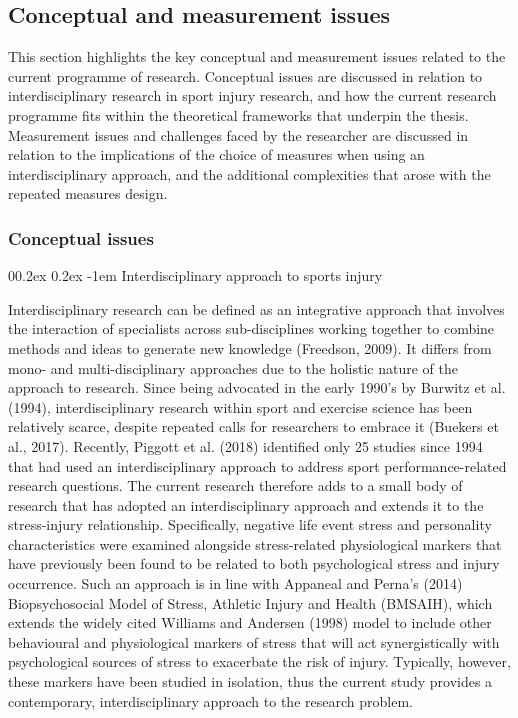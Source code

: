 \documentclass[
  english,
  man,floatsintext]{apa6}
\makeatletter
\renewcommand{\paragraph}{\@startsection{paragraph}{4}{\parindent}%
  {0\baselineskip \@plus 0.2ex \@minus 0.2ex}%
  {-1em}%
  {\normalfont\normalsize\bfseries\itshape\typesectitle}}
\makeatother
\begin{document}
\hypertarget{conceptual-and-measurement-issues}{%
\subsection{Conceptual and measurement issues}\label{conceptual-and-measurement-issues}}

This section highlights the key conceptual and measurement issues related to the current programme of research.
Conceptual issues are discussed in relation to interdisciplinary research in sport injury research, and how the current research programme fits within the theoretical frameworks that underpin the thesis.
Measurement issues and challenges faced by the researcher are discussed in relation to the implications of the choice of measures when using an interdisciplinary approach, and the additional complexities that arose with the repeated measures design.

\hypertarget{conceptual-issues}{%
\subsubsection{Conceptual issues}\label{conceptual-issues}}

\hypertarget{interdisciplinary-approach-to-sports-injury}{%
\paragraph{Interdisciplinary approach to sports injury}\label{interdisciplinary-approach-to-sports-injury}}

Interdisciplinary research can be defined as an integrative approach that involves the interaction of specialists across sub-disciplines working together to combine methods and ideas to generate new knowledge (Freedson, 2009).
It differs from mono- and multi-disciplinary approaches due to the holistic nature of the approach to research.
Since being advocated in the early 1990's by Burwitz et al. (1994), interdisciplinary research within sport and exercise science has been relatively scarce, despite repeated calls for researchers to embrace it (Buekers et al., 2017).
Recently, Piggott et al. (2018) identified only 25 studies since 1994 that had used an interdisciplinary approach to address sport performance-related research questions.
The current research therefore adds to a small body of research that has adopted an interdisciplinary approach and extends it to the stress-injury relationship.
Specifically, negative life event stress and personality characteristics were examined alongside stress-related physiological markers that have previously been found to be related to both psychological stress and injury occurrence.
Such an approach is in line with Appaneal and Perna's (2014) Biopsychosocial Model of Stress, Athletic Injury and Health (BMSAIH), which extends the widely cited Williams and Andersen (1998) model to include other behavioural and physiological markers of stress that will act synergistically with psychological sources of stress to exacerbate the risk of injury.
Typically, however, these markers have been studied in isolation, thus the current study provides a contemporary, interdisciplinary approach to the research problem.
\end{document}
